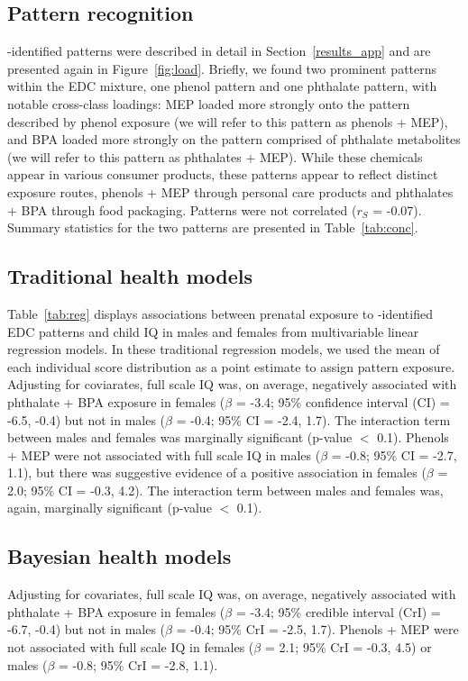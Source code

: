 \endgroup

\subsection{Pattern recognition}
\bnmfc-identified patterns were described in detail in Section~\ref{results_app} and are presented again in Figure~\ref{fig:load}. Briefly, we found two prominent patterns within the EDC mixture, one phenol pattern and one phthalate pattern, with notable cross-class loadings: MEP loaded more strongly onto the pattern described by phenol exposure (we will refer to this pattern as phenols + MEP), and BPA loaded more strongly on the pattern comprised of phthalate metabolites (we will refer to this pattern as phthalates + MEP). While these chemicals appear in various consumer products, these patterns appear to reflect distinct exposure routes, phenols + MEP through personal care products and phthalates + BPA through food packaging. Patterns were not correlated ($r_S$ = -0.07). Summary statistics for the two patterns are presented in Table~\ref{tab:conc}.

\subsection{Traditional health models}
Table~\ref{tab:reg} displays associations between prenatal exposure to \bnmfc-identified EDC patterns and child IQ in males and females from multivariable linear regression models. In these traditional regression models, we used the mean of each individual score distribution as a point estimate to assign pattern exposure. Adjusting for coviarates, full scale IQ was, on average, negatively associated with phthalate + BPA exposure in females ($\beta$ = -3.4; 95\% confidence interval (CI) = -6.5, -0.4) but not in males ($\beta$ = -0.4; 95\% CI = -2.4, 1.7). The interaction term between males and females was marginally significant (p-value $<$ 0.1). Phenols + MEP were not associated with full scale IQ in males ($\beta$ = -0.8; 95\% CI =  -2.7, 1.1), but there was suggestive evidence of a positive association in females ($\beta$ = 2.0; 95\% CI = -0.3, 4.2). The interaction term between males and females was, again, marginally significant (p-value $<$ 0.1).

\subsection{Bayesian health models}
Adjusting for covariates, full scale IQ was, on average, negatively associated with phthalate + BPA exposure in females ($\beta$ = -3.4; 95\% credible interval (CrI) = -6.7, -0.4) but not in males ($\beta$ = -0.4; 95\% CrI = -2.5, 1.7). Phenols + MEP were not associated with full scale IQ in females ($\beta$ = 2.1; 95\% CrI = -0.3, 4.5) or males ($\beta$ = -0.8; 95\% CrI = -2.8, 1.1). \\

